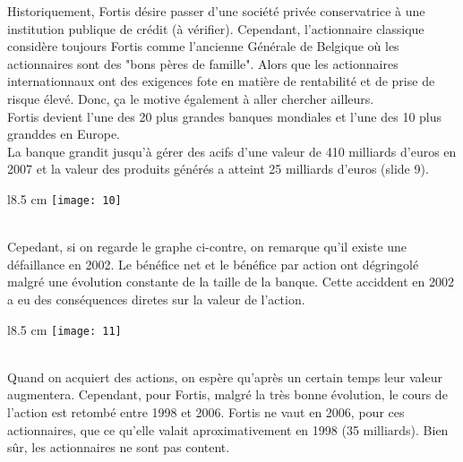 Historiquement, Fortis désire passer d'une société privée conservatrice à une institution publique de crédit (à vérifier). Cependant, l'actionnaire classique considère toujours Fortis comme l'ancienne Générale de Belgique où les actionnaires sont des "bons pères de famille". Alors que les actionnaires internationnaux ont des exigences fote en matière de rentabilité et de prise de risque élevé. Donc, ça le motive également à aller chercher ailleurs. \\
Fortis devient l'une des 20 plus grandes banques mondiales et l'une des 10 plus granddes en Europe. \\
La banque grandit jusqu'à gérer des acifs d'une valeur de 410 milliards d'euros en 2007 et la valeur des produits générés a atteint 25 milliards d'euros (slide 9). 

\begin{wrapfigure}[8]{l}{8.5 cm}
	\texttt{[image: 10]}
\end{wrapfigure}
\ \\ Cepedant, si on regarde le graphe ci-contre, on remarque qu'il existe une défaillance en 2002. Le bénéfice net et le bénéfice par action ont dégringolé malgré une évolution constante de la taille de la banque. Cette acciddent en 2002 a eu des conséquences diretes sur la valeur de l'action. 

\begin{wrapfigure}[10]{l}{8.5 cm}
	\texttt{[image: 11]}
\end{wrapfigure}
\ \\ Quand on acquiert des actions, on espère qu'après un certain temps leur valeur augmentera. Cependant, pour Fortis, malgré la très bonne évolution, le cours de l'action est retombé entre 1998 et 2006. Fortis ne vaut en 2006, pour ces actionnaires, que ce qu'elle valait aproximativement en 1998 (35 milliards). Bien sûr, les actionnaires ne sont pas content. 

